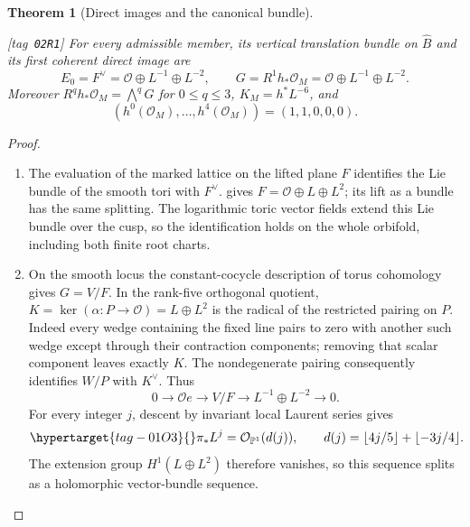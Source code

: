 \documentclass[11pt,a4paper]{article}
\numberwithin{equation}{section}
\newtheorem{theorem}{Theorem}[section]
\theoremstyle{definition}
\newcommand{\StatementRecord}[4]{{\upshape\footnotesize[tag~\texttt{#3}]}\enspace\ignorespaces}
\begin{document}
\begin{theorem}[Direct images and the canonical bundle]\hypertarget{tag-02R1}{}\label{night:P1A.1}
\StatementRecord{night:P1A.1}{proved}{02R1}{\cref{night:P1.10}, \cref{night:P1.8}, \cref{night:P1.9}}
For every admissible member, its vertical translation bundle on
$\widehat B$ and its first coherent direct image are
\[
 E_0=F^\vee=\mathcal O\oplus L^{-1}\oplus L^{-2},\qquad
 G=R^1h_*\mathcal O_M=\mathcal O\oplus L^{-1}\oplus L^{-2}.
\]
Moreover $R^qh_*\mathcal O_M=\bigwedge^qG$ for $0\le q\le3$,
$K_M=h^*L^{-6}$, and
\[
 (h^0(\mathcal O_M),\ldots,h^4(\mathcal O_M))=(1,1,0,0,0).
\]
\end{theorem}
\begin{proof}
\begin{enumerate}[label=\arabic*.]
\item The evaluation of the marked lattice on the lifted plane $F$
identifies the Lie bundle of the smooth tori with $F^\vee$.
 gives $F=\mathcal O\oplus L\oplus L^2$; its lift as a bundle
has the same splitting. The logarithmic toric vector fields extend
this Lie bundle over the cusp, so the identification holds on the
whole orbifold, including both finite root charts.

\item On the smooth locus the constant-cocycle description of torus
cohomology gives $G=V/F$. In the rank-five orthogonal quotient,
$K=\ker(\alpha:P\to\mathcal O)=L\oplus L^2$ is the radical of
the restricted pairing on $P$. Indeed every wedge containing the
fixed line pairs to zero with another such wedge except through
their contraction components; removing that scalar component
leaves exactly $K$. The nondegenerate pairing consequently
identifies $W/P$ with $K^\vee$. Thus
\[
 0\longrightarrow\mathcal O e\longrightarrow V/F
   \longrightarrow L^{-1}\oplus L^{-2}\longrightarrow0.
\]
For every integer $j$, descent by invariant local Laurent series gives
\begin{equation}\hypertarget{tag-01O3}{}\label{eq:P1Adegree}
 \pi_*L^j=\mathcal O_{\mathbb P^1}(d(j)),\qquad
 d(j)=\lfloor4j/5\rfloor+\lfloor-3j/4\rfloor.
\end{equation}
The extension group $H^1(L\oplus L^2)$ therefore vanishes, so this
sequence splits as a holomorphic vector-bundle sequence.


\end{enumerate}
\end{proof}
\end{document}
